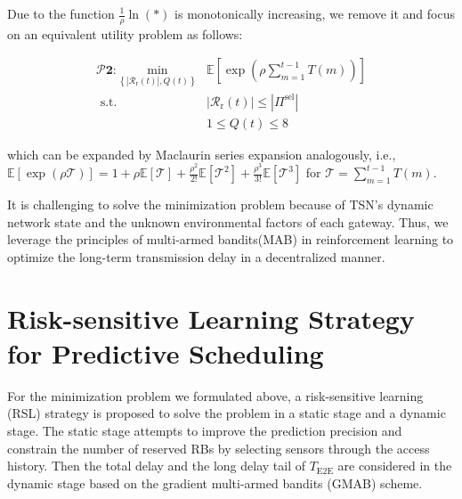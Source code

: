 \documentclass{SCIS2021}
\begin{document}
	\par Due to the function $\frac{1}{\rho} \ln \left(*\right)$ is monotonically increasing, we remove it and focus on an equivalent utility problem as follows:
	
	\setlength\abovedisplayskip{-16pt}
	\begin{center}
		\begin{equation}
			\label{p2}
			\begin{aligned}
				\bm{\mathcal{P}2:} \underset{\left\{\left|\mathcal{R}_\mathrm{r}(t)\right|, Q(t)\right\}}{\mathrm{min}} &\mathbb{E}[\exp (\rho \sum_{m=1}^{t-1} T(m))] \\
				\text { s.t. } &\left|\mathcal{R}_\mathrm{r}(t)\right| \leq\left| \Pi^\text{sel} \right|  \\
				&1 \leq Q(t) \leq 8
			\end{aligned}
		\end{equation}
	\end{center}
	\setlength\belowdisplayskip{-8pt}
	
	\vspace{-5pt}
	\noindent which can be expanded by Maclaurin series expansion analogously, i.e., $\mathbb{E}[\exp (\rho \mathcal{T})] = 1 + \rho \mathbb{E}[\mathcal{T}] + \frac{\rho^2}{2!} \mathbb{E}[\mathcal{T}^2] + \frac{\rho^3}{3!} \mathbb{E}[\mathcal{T}^3]$ for $\mathcal{T} = \sum_{m=1}^{t-1} T(m)$.
	
	\par It is challenging to solve the minimization problem because of TSN's dynamic network state and the unknown environmental factors of each gateway. Thus, we leverage the principles of multi-armed bandits(MAB) in reinforcement learning to optimize the long-term transmission delay in a decentralized manner.
	
	\section{Risk-sensitive Learning Strategy for Predictive Scheduling}
	\label{learning} 
	For the minimization problem we formulated above, a risk-sensitive learning (RSL) strategy is proposed to solve the problem in a static stage and a dynamic stage. The static stage attempts to improve the prediction precision and constrain the number of reserved RBs by selecting sensors through the access history. Then the total delay and the long delay tail of $T_\text{E2E}$ are considered in the dynamic stage based on the gradient multi-armed bandits (GMAB) scheme.
	
\end{document}
